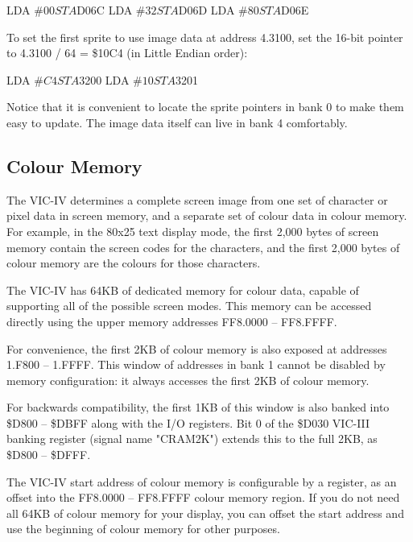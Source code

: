 \begin{screenoutput}
LDA #$00
STA $D06C
LDA #$32
STA $D06D
LDA #$80
STA $D06E
\end{screenoutput}

To set the first sprite to use image data at address 4.3100, set the 16-bit
pointer to 4.3100 / 64 = \$10C4 (in Little Endian order):

\begin{screenoutput}
LDA #$C4
STA $3200
LDA #$10
STA $3201
\end{screenoutput}

Notice that it is convenient to locate the sprite pointers in bank 0 to make
them easy to update. The image data itself can live in bank 4 comfortably.

\subsection{Colour Memory}

The VIC-IV determines a complete screen image from one set of character or pixel
data in screen memory, and a separate set of colour data in colour memory. For
example, in the 80x25 text display mode, the first 2,000 bytes of screen memory
contain the screen codes for the characters, and the first 2,000 bytes of
colour memory are the colours for those characters.

The VIC-IV has 64KB of dedicated memory for colour data, capable of supporting
all of the possible screen modes. This memory can be accessed directly using
the upper memory addresses FF8.0000 -- FF8.FFFF.


For convenience, the first 2KB of colour memory is
also exposed at addresses 1.F800 -- 1.FFFF. This window of addresses in bank 1
cannot be disabled by memory configuration: it always accesses the first 2KB of
colour memory.

For backwards compatibility, the first 1KB of this window is also banked
into \$D800 -- \$DBFF along with the I/O registers. Bit 0 of the \$D030 VIC-III
banking register (signal name "CRAM2K") extends this to the full 2KB, as \$D800
-- \$DFFF.

The VIC-IV start address of colour memory is configurable by a register, as an
offset into the FF8.0000 -- FF8.FFFF colour memory region. If you do not need
all 64KB of colour memory for your display, you can offset the start address
and use the beginning of colour memory for other purposes.

